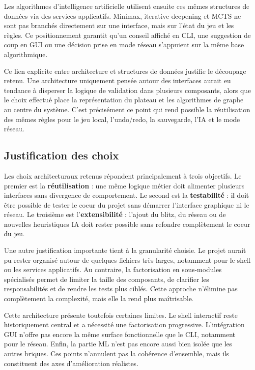 Les algorithmes d'intelligence artificielle utilisent ensuite ces mêmes
structures de données via des services applicatifs. Minimax, iterative
deepening et MCTS ne sont pas branchés directement sur une interface, mais sur
l'état du jeu et les règles. Ce positionnement garantit qu'un conseil affiché
en CLI, une suggestion de coup en GUI ou une décision prise en mode réseau
s'appuient sur la même base algorithmique.

Ce lien explicite entre architecture et structures de données justifie le
découpage retenu. Une architecture uniquement pensée autour des interfaces
aurait eu tendance à disperser la logique de validation dans plusieurs
composants, alors que le choix effectué place la représentation du plateau et
les algorithmes de graphe au centre du système. C'est précisément ce point qui
rend possible la réutilisation des mêmes règles pour le jeu local, l'undo/redo,
la sauvegarde, l'IA et le mode réseau.

\subsection{Justification des choix}

Les choix architecturaux retenus répondent principalement à trois objectifs.
Le premier est la \textbf{réutilisation} : une même logique métier doit
alimenter plusieurs interfaces sans divergence de comportement. Le second est
la \textbf{testabilité} : il doit être possible de tester le coeur du projet
sans démarrer l'interface graphique ni le réseau. Le troisième est
l'\textbf{extensibilité} : l'ajout du blitz, du réseau ou de nouvelles
heuristiques IA doit rester possible sans refondre complètement le coeur du
jeu.

Une autre justification importante tient à la granularité choisie. Le projet
aurait pu rester organisé autour de quelques fichiers très larges, notamment
pour le shell ou les services applicatifs. Au contraire, la factorisation en
sous-modules spécialisés permet de limiter la taille des composants, de
clarifier les responsabilités et de rendre les tests plus ciblés. Cette
approche n'élimine pas complètement la complexité, mais elle la rend plus
maîtrisable.

Cette architecture présente toutefois certaines limites. Le shell interactif
reste historiquement central et a nécessité une factorisation progressive.
L'intégration GUI n'offre pas encore la même surface fonctionnelle que le CLI,
notamment pour le réseau. Enfin, la partie ML n'est pas encore aussi bien
isolée que les autres briques. Ces points n'annulent pas la cohérence
d'ensemble, mais ils constituent des axes d'amélioration réalistes.

